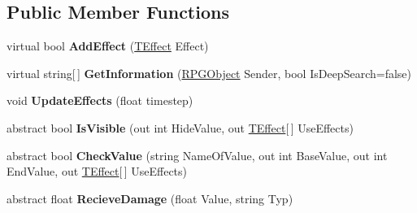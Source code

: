 \subsection*{Public Member Functions}
\begin{DoxyCompactItemize}
\item 
\hypertarget{class_r_p_g_object_adf3b238298fba6c2c3551102b042699d}{}virtual bool {\bfseries Add\+Effect} (\hyperlink{class_t_effect}{T\+Effect} Effect)\label{class_r_p_g_object_adf3b238298fba6c2c3551102b042699d}

\item 
\hypertarget{class_r_p_g_object_abbb053e8e6cbcd036d3ae91a1d593720}{}virtual string\mbox{[}$\,$\mbox{]} {\bfseries Get\+Information} (\hyperlink{class_r_p_g_object}{R\+P\+G\+Object} Sender, bool Is\+Deep\+Search=false)\label{class_r_p_g_object_abbb053e8e6cbcd036d3ae91a1d593720}

\item 
\hypertarget{class_r_p_g_object_a931b4ce1cf1e97c803438f70e10c8784}{}void {\bfseries Update\+Effects} (float timestep)\label{class_r_p_g_object_a931b4ce1cf1e97c803438f70e10c8784}

\item 
\hypertarget{class_r_p_g_object_a870001224da5b930a8903c83929c162f}{}abstract bool {\bfseries Is\+Visible} (out int Hide\+Value, out \hyperlink{class_t_effect}{T\+Effect}\mbox{[}$\,$\mbox{]} Use\+Effects)\label{class_r_p_g_object_a870001224da5b930a8903c83929c162f}

\item 
\hypertarget{class_r_p_g_object_ad35719a061adfae0dd43f343aceab73b}{}abstract bool {\bfseries Check\+Value} (string Name\+Of\+Value, out int Base\+Value, out int End\+Value, out \hyperlink{class_t_effect}{T\+Effect}\mbox{[}$\,$\mbox{]} Use\+Effects)\label{class_r_p_g_object_ad35719a061adfae0dd43f343aceab73b}

\item 
\hypertarget{class_r_p_g_object_ace0438534a4b8d6efa00a08ae6fab68b}{}abstract float {\bfseries Recieve\+Damage} (float Value, string Typ)\label{class_r_p_g_object_ace0438534a4b8d6efa00a08ae6fab68b}

\end{DoxyCompactItemize}
